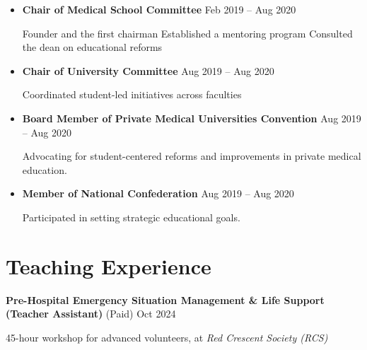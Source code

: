\documentclass[letterpaper,11pt]{article} %
\begin{document}
\vspace{-0.5\baselineskip}
\begin{itemize}
\item \textbf{Chair of Medical School Committee} \hfill \footnotesize{Feb 2019 -- Aug 2020} \normalsize

\begin{adjustwidth}{0.5cm}{2cm}
Founder and the first chairman
\newline Established a mentoring program
\newline Consulted the dean on educational reforms
\end{adjustwidth}

\item \textbf{Chair of University Committee} \hfill \footnotesize{Aug 2019 -- Aug 2020} \normalsize

\begin{adjustwidth}{0.5cm}{2cm}
Coordinated student-led initiatives across faculties
\end{adjustwidth}

\item \textbf{Board Member of Private Medical Universities Convention} \hfill \footnotesize{Aug 2019 -- Aug 2020} \normalsize
\begin{adjustwidth}{0.5cm}{2cm}
Advocating for student-centered reforms and improvements in private medical education.
\end{adjustwidth}

\item \textbf{Member of National Confederation} \hfill \footnotesize{Aug 2019 -- Aug 2020} \normalsize
\begin{adjustwidth}{0.5cm}{2cm}
Participated in setting strategic educational goals.
\end{adjustwidth}
\end{itemize}

\section{Teaching Experience}

\textbf{Pre-Hospital Emergency Situation Management \& Life Support (Teacher Assistant)} (Paid)  \hfill \footnotesize{Oct 2024} \normalsize
\vspace{-0.5\baselineskip}
\begin{adjustwidth}{0.5cm}{2cm}
45-hour workshop for advanced volunteers, at \emph{Red Crescent Society (RCS)}
\end{adjustwidth}
\end{document}
